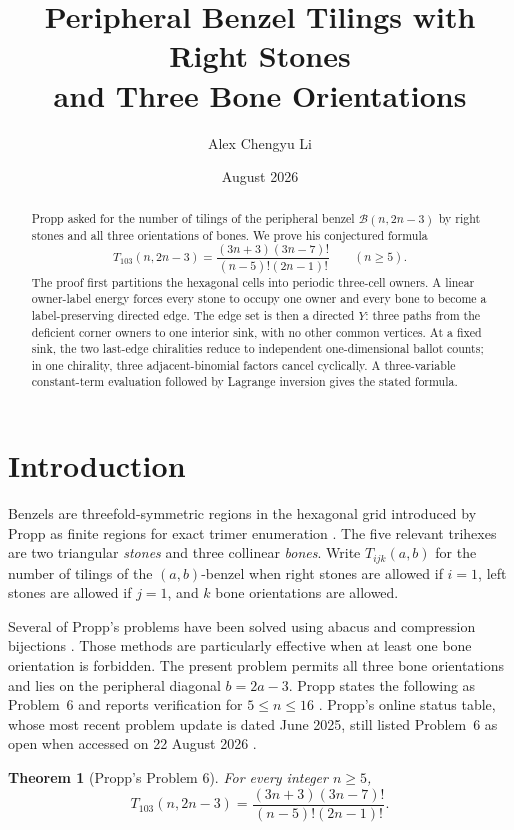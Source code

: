 \documentclass[11pt]{amsart}
\title[Peripheral benzel tilings]
{Peripheral Benzel Tilings with Right Stones\\
and Three Bone Orientations}
\author{Alex Chengyu Li}
\date{August 2026}
\newtheorem{theorem}{Theorem}[section]
\theoremstyle{definition}
\newcommand{\Bz}{\mathcal B}
\begin{document}
\begin{abstract}
Propp asked for the number of tilings of the peripheral benzel
$\Bz(n,2n-3)$ by right stones and all three orientations of bones.  We prove
his conjectured formula
\[
 T_{103}(n,2n-3)
 =\frac{(3n+3)(3n-7)!}{(n-5)!(2n-1)!}\qquad(n\geq5).
\]
The proof first partitions the hexagonal cells into periodic three-cell
owners.  A linear owner-label energy forces every stone to occupy one owner
and every bone to become a label-preserving directed edge.  The edge set is
then a directed $Y$: three paths from the deficient corner owners to one
interior sink, with no other common vertices.  At a fixed sink, the two
last-edge chiralities reduce to independent one-dimensional ballot counts; in
one chirality, three adjacent-binomial factors cancel cyclically.  A
three-variable constant-term evaluation followed by Lagrange inversion gives
the stated formula.
\end{abstract}

\maketitle

\section{Introduction}

Benzels are threefold-symmetric regions in the hexagonal grid introduced by
Propp as finite regions for exact trimer enumeration
\cite{ProppProblems}.  The five relevant trihexes are two triangular
\emph{stones} and three collinear \emph{bones}.  Write $T_{ijk}(a,b)$ for
the number of tilings of the $(a,b)$-benzel when right stones are allowed if
$i=1$, left stones are allowed if $j=1$, and $k$ bone orientations are
allowed.

Several of Propp's problems have been solved using abacus and compression
bijections \cite{DLPY,DFLPY}.  Those methods are particularly effective when
at least one bone orientation is forbidden.  The present problem permits all
three bone orientations and lies on the peripheral diagonal $b=2a-3$.
Propp states the following as Problem~6 and reports verification for
$5\leq n\leq16$ \cite{ProppProblems}.  Propp's online status table, whose
most recent problem update is dated June 2025, still listed Problem~6 as open
when accessed on 22 August 2026 \cite{ProppSite}.

\begin{theorem}[Propp's Problem 6]\label{thm:main}
For every integer $n\geq5$,
\[
 T_{103}(n,2n-3)
 =\frac{(3n+3)(3n-7)!}{(n-5)!(2n-1)!}.
\]
\end{theorem}
\end{document}
